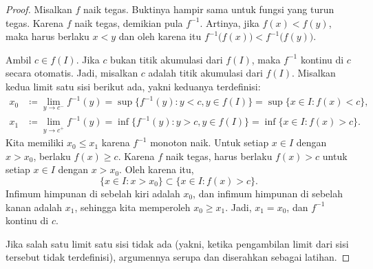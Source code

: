 \begin{proof}
Misalkan $f$ naik tegas.  Buktinya hampir
sama untuk fungsi yang turun tegas.
Karena $f$ naik tegas, demikian pula $f^{-1}$.  Artinya, jika $f(x) <
f(y)$, maka harus berlaku $x < y$ dan oleh karena itu
$f^{-1}\bigl(f(x)\bigr) < f^{-1}\bigl(f(y)\bigr)$.

Ambil $c \in f(I)$.
Jika $c$ bukan titik akumulasi dari $f(I)$, maka $f^{-1}$ kontinu di $c$
secara otomatis.  Jadi, misalkan $c$ adalah titik akumulasi dari $f(I)$.
Misalkan kedua limit satu sisi berikut ada, yakni keduanya
terdefinisi:
\begin{align*}
x_0 & \coloneqq \lim_{y \to c^-} f^{-1}(y) =
\sup \bigl\{ f^{-1}(y) : y < c, y \in f(I) \bigr\}
=
\sup \bigl\{ x \in I : f(x) < c \bigr\} , \\
x_1 & \coloneqq \lim_{y \to c^+} f^{-1}(y) =
\inf \bigl\{ f^{-1}(y) : y > c, y \in f(I) \bigr\}
=
\inf \bigl\{ x \in I : f(x) > c \bigr\} .
\end{align*}
Kita memiliki $x_0 \leq x_1$ karena $f^{-1}$ monoton naik.
Untuk setiap $x \in I$ dengan $x > x_0$, berlaku $f(x) \geq c$.  Karena $f$ naik tegas,
harus berlaku $f(x) > c$ untuk setiap $x \in I$ dengan $x > x_0$.  Oleh karena itu,
\begin{equation*}
\{ x \in I : x > x_0 \} \subset \bigl\{ x \in I : f(x) > c \bigr\}.
\end{equation*}
Infimum himpunan di sebelah kiri adalah $x_0$, dan infimum himpunan di sebelah kanan
adalah $x_1$, sehingga kita memperoleh $x_0 \geq x_1$.
Jadi, $x_1 = x_0$, dan $f^{-1}$ kontinu di $c$.

Jika salah satu limit satu sisi tidak ada (yakni, ketika pengambilan limit dari
sisi tersebut tidak terdefinisi), argumennya serupa
dan diserahkan sebagai latihan.
\end{proof}

